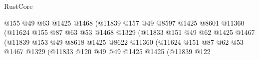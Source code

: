 \begin{lexlean}{RustCore}
\begin{coremodule}
                                            @155
                                            @49
                                            @63
                                            @1425
                                            @1468
                                            (@11839
                                              @157
                                              @49
                                              @8597
                                              @1425
                                              @8601
                                              @11360
                                              (@11624
                                                @155
                                                @87
                                                @63
                                                @53
                                                @1468
                                                @1329
                                                (@11833
                                                  @151
                                                  @49
                                                  @62
                                                  @1425
                                                  @1467
                                                  (@11839
                                                    @153
                                                    @49
                                                    @8618
                                                    @1425
                                                    @8622
                                                    @11360
                                                    (@11624
                                                      @151
                                                      @87
                                                      @62
                                                      @53
                                                      @1467
                                                      @1329
                                                      (@11833
                                                        @120
                                                        @49
                                                        @49
                                                        @1425
                                                        @1425
                                                        (@11839
                                                          @122

\end{coremodule}
\end{lexlean}
